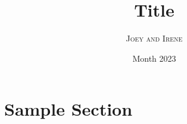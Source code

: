 \documentclass{article}
\title{Title}
\author{\textsc{Joey and Irene}}
\date{Month 2023}
\newcommand{\<}{\langle}
\renewcommand{\>}{\rangle}
\begin{document}
\maketitle
        \tableofcontents
        \newpage
        \section{Sample Section}
\end{document}

